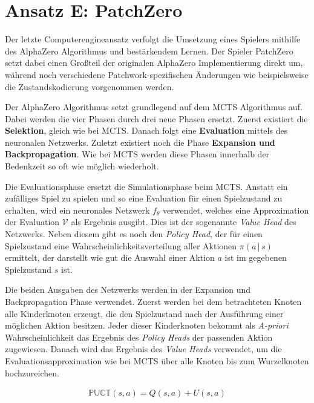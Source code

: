 \pagebreak

\section{Ansatz E: PatchZero}
\label{section:erstellung-ansatz-d}

Der letzte Computerengineansatz verfolgt die Umsetzung eines Spielers mithilfe des AlphaZero Algorithmus und bestärkendem Lernen. Der Spieler PatchZero setzt dabei einen Großteil der originalen AlphaZero Implementierung direkt um, während noch verschiedene Patchwork-spezifischen Änderungen wie beispielsweise die Zustandskodierung vorgenommen werden.

Der AlphaZero Algorithmus setzt grundlegend auf dem \ac{MCTS} Algorithmus auf. Dabei werden die vier Phasen durch drei neue Phasen ersetzt. Zuerst existiert die \textbf{Selektion}, gleich wie bei \ac{MCTS}. Danach folgt eine \textbf{Evaluation} mittels des neuronalen Netzwerks. Zuletzt existiert noch die Phase \textbf{Expansion und Backpropagation}. Wie bei \ac{MCTS} werden diese Phasen innerhalb der Bedenkzeit so oft wie möglich wiederholt.

Die Evaluationsphase ersetzt die Simulationsphase beim \ac{MCTS}. Anstatt ein zufälliges Spiel zu spielen und so eine Evaluation für einen Spielzustand zu erhalten, wird ein neuronales Netzwerk $f_\theta$ verwendet, welches eine Approximation der Evaluation $\mathcal{V}$ als Ergebnis ausgibt. Dies ist der sogenannte \emph{Value Head} des Netzwerks. Neben diesem gibt es noch den \emph{Policy Head}, der für einen Spielzustand eine Wahrscheinlichkeitsverteilung aller Aktionen $\pi\left(a\,|\,s\right)$ ermittelt, der darstellt wie gut die Auswahl einer Aktion $a$ ist im gegebenen Spielzustand $s$ ist.

Die beiden Ausgaben des Netzwerks werden in der Expansion und Backpropagation Phase verwendet. Zuerst werden bei dem betrachteten Knoten alle Kinderknoten erzeugt, die den Spielzustand nach der Ausführung einer möglichen Aktion besitzen. Jeder dieser Kinderknoten bekommt als \emph{A-priori} Wahrscheinlichkeit das Ergebnis des \emph{Policy Heads} der passenden Aktion zugewiesen. Danach wird das Ergebnis des \emph{Value Heads} verwendet, um die Evaluationsapproximation wie bei \ac{MCTS} über alle Knoten bis zum Wurzelknoten hochzureichen.


\begin{align}
    \label{eqn:alpha-zero-puct}
    \mathbb{PUCT}\left(s, a\right) = Q\left(s,a\right) + U\left(s,a\right)
\end{align}

